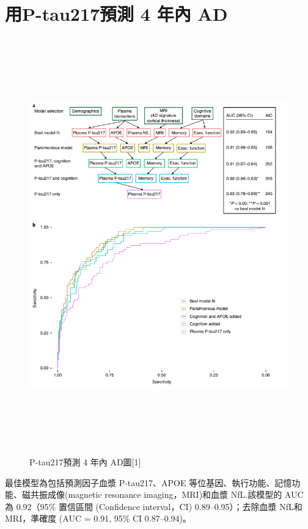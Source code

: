\section{用P-tau217預測 4 年內 AD }
\begin{figure}[H]
	\centering
	\centerline{\includegraphics[height=18cm]{pic/AD217.PNG}}
	\caption{P-tau217預測 4 年內 AD圖[1]}

	\label{fig:AD217}
\end{figure}
最佳模型為包括預測因子血漿 P-tau217、APOE 等位基因、執行功能、記憶功能、磁共振成像(magnetic resonance imaging，MRI)和血漿 NfL.該模型的 AUC 為 0.92（95\% 置信區間 (Confidence interval，CI) 0.89–0.95）；去除血漿 NfL和MRI，準確度 (AUC = 0.91, 95\% CI 0.87–0.94)。



